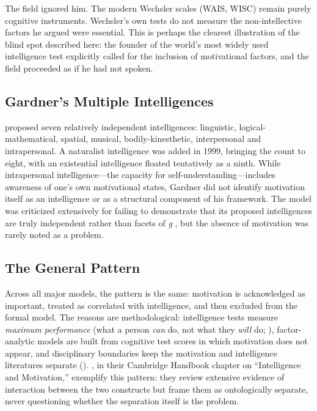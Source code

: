 \documentclass[12pt,a4paper]{article}
\begin{document}
The field ignored him. The modern Wechsler scales (WAIS, WISC) remain purely cognitive instruments. Wechsler's own tests do not measure the non-intellective factors he argued were essential. This is perhaps the clearest illustration of the blind spot described here: the founder of the world's most widely used intelligence test explicitly called for the inclusion of motivational factors, and the field proceeded as if he had not spoken.

\subsection{Gardner's Multiple Intelligences}

\citet{Gardner1983} proposed seven relatively independent intelligences: linguistic, logical-mathematical, spatial, musical, bodily-kinesthetic, interpersonal and intrapersonal. A naturalist intelligence was added in 1999, bringing the count to eight, with an existential intelligence floated tentatively as a ninth. While intrapersonal intelligence---\hspace{0pt}the capacity for self-understanding---\hspace{0pt}includes awareness of one's own motivational states, Gardner did not identify motivation itself as an intelligence or as a structural component of his framework. The model was criticized extensively for failing to demonstrate that its proposed intelligences are truly independent rather than facets of \emph{g} \citep{Waterhouse2006}, but the absence of motivation was rarely noted as a problem.

\subsection{The General Pattern}

Across all major models, the pattern is the same: motivation is acknowledged as important, treated as correlated with intelligence, and then excluded from the formal model. The reasons are methodological: intelligence tests measure \emph{maximum performance} (what a person \emph{can} do, not what they \emph{will} do; \citealp{Cronbach1949}), factor-analytic models are built from cognitive test scores in which motivation does not appear, and disciplinary boundaries keep the motivation and intelligence literatures separate (\citealp[for exceptions, see][]{Murayama2013,CredeKuncel2008}). \citet{CarrDweck2019}, in their Cambridge Handbook chapter on ``Intelligence and Motivation,'' exemplify this pattern: they review extensive evidence of interaction between the two constructs but frame them as ontologically separate, never questioning whether the separation itself is the problem.
\end{document}
